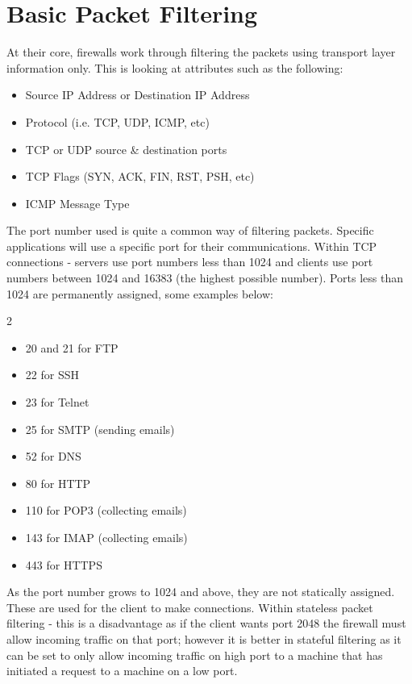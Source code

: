 \section{Basic Packet Filtering}
At their core, firewalls work through filtering the packets using transport layer information only. This is looking at attributes such as the following:
\begin{itemize}
    \item Source IP Address or Destination IP Address
    \item Protocol (i.e. TCP, UDP, ICMP, etc)
    \item TCP or UDP source \& destination ports
    \item TCP Flags (SYN, ACK, FIN, RST, PSH, etc)
    \item ICMP Message Type
\end{itemize}

The port number used is quite a common way of filtering packets. Specific applications will use a specific port for their communications. Within TCP connections - servers use port numbers less than 1024 and clients use port numbers between 1024 and 16383 (the highest possible number). Ports less than 1024 are permanently assigned, some examples below:
\begin{multicols}{2}
    \begin{itemize}
        \item 20 and 21 for FTP
        \item 22 for SSH
        \item 23 for Telnet
        \item 25 for SMTP (sending emails)
        \item 52 for DNS
        \item 80 for HTTP
        \item 110 for POP3 (collecting emails)
        \item 143 for IMAP (collecting emails)
        \item 443 for HTTPS
    \end{itemize}
\end{multicols}

As the port number grows to 1024 and above, they are not statically assigned. These are used for the client to make connections. Within stateless packet filtering - this is a disadvantage as if the client wants port 2048 the firewall must allow incoming traffic on that port; however it is better in stateful filtering as it can be set to only allow incoming traffic on high port to a machine that has initiated a request to a machine on a low port. 

